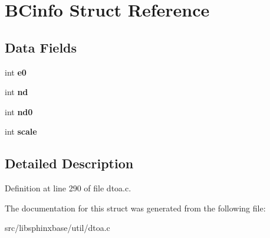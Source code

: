 \section{B\+Cinfo Struct Reference}
\label{structBCinfo}
\subsection*{Data Fields}
\begin{DoxyCompactItemize}
\item 
int {\bfseries e0}\label{structBCinfo_a3465f7cb1203532a3dc29c5a01e05526}

\item 
int {\bfseries nd}\label{structBCinfo_ac189da9f6f82f8846017c40e5872e4a7}

\item 
int {\bfseries nd0}\label{structBCinfo_a9d30accd41a03e88ebd52591258b76fa}

\item 
int {\bfseries scale}\label{structBCinfo_a59b720f0388e80e21b950723aa53b56e}

\end{DoxyCompactItemize}


\subsection{Detailed Description}


Definition at line 290 of file dtoa.\+c.



The documentation for this struct was generated from the following file\+:\begin{DoxyCompactItemize}
\item 
src/libsphinxbase/util/dtoa.\+c\end{DoxyCompactItemize}
